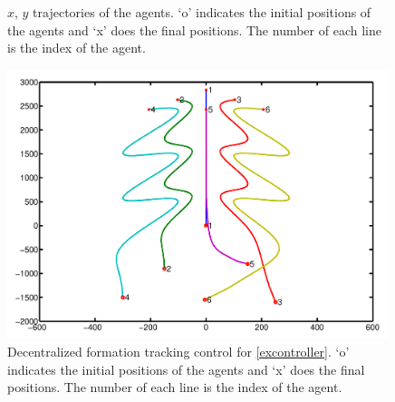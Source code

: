 \documentclass[11pt, a4paper, oneside, openany, reqno]{book}
\theoremstyle{definition}
\theoremstyle{remark}
\numberwithin{equation}{chapter} %
\begin{document}
\begin{figure}[htp]
	\centering
	\caption{$ x $, $ y $ trajectories of the agents.
		`o' indicates the initial positions of the agents and 
		`x' does the final positions. The number of each line is the index of the agent.}	
\end{figure}

\begin{figure}[htp]
	\centering
	\includegraphics[width=0.99\textwidth]{formationTracking.pdf}
	\caption{Decentralized formation tracking control for \eqref{excontroller}.
		`o' indicates the initial positions of the agents and 
		`x' does the final positions. The number of each line is the index of the agent.}		
\end{figure}
\end{document}
